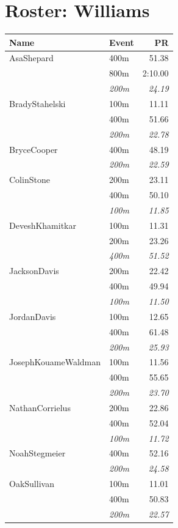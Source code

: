 \documentclass[11pt]{article}
\begin{document}
\noindent\section*{Roster: Williams}
\begin{tabularx}{\textwidth}{lXr}
\toprule
\textbf{Name} & \textbf{Event} & \textbf{PR} \\
\midrule
AsaShepard & 400m & 51.38 \\
& 800m & 2:10.00 \\
& \textit{200m} & \textit{24.19} \\
\midrule
BradyStahelski & 100m & 11.11 \\
& 400m & 51.66 \\
& \textit{200m} & \textit{22.78} \\
\midrule
BryceCooper & 400m & 48.19 \\
& \textit{200m} & \textit{22.59} \\
\midrule
ColinStone & 200m & 23.11 \\
& 400m & 50.10 \\
& \textit{100m} & \textit{11.85} \\
\midrule
DeveshKhamitkar & 100m & 11.31 \\
& 200m & 23.26 \\
& \textit{400m} & \textit{51.52} \\
\midrule
JacksonDavis & 200m & 22.42 \\
& 400m & 49.94 \\
& \textit{100m} & \textit{11.50} \\
\midrule
JordanDavis & 100m & 12.65 \\
& 400m & 61.48 \\
& \textit{200m} & \textit{25.93} \\
\midrule
JosephKouameWaldman & 100m & 11.56 \\
& 400m & 55.65 \\
& \textit{200m} & \textit{23.70} \\
\midrule
NathanCorrielus & 200m & 22.86 \\
& 400m & 52.04 \\
& \textit{100m} & \textit{11.72} \\
\midrule
NoahStegmeier & 400m & 52.16 \\
& \textit{200m} & \textit{24.58} \\
\midrule
OakSullivan & 100m & 11.01 \\
& 400m & 50.83 \\
& \textit{200m} & \textit{22.57} \\

\end{tabularx}
\end{document}
